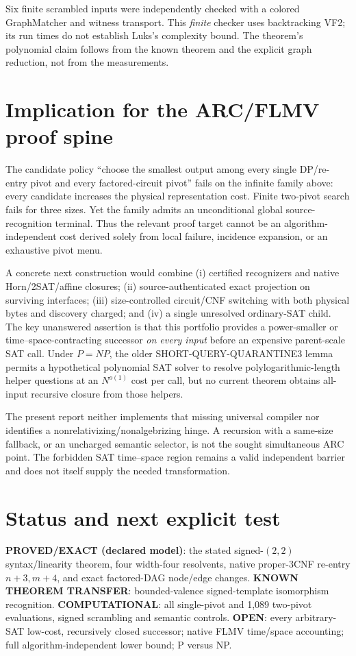 \documentclass[11pt]{article}
\newcommand{\OPEN}{\textbf{OPEN}}
\newcommand{\EXACT}{\textbf{PROVED/EXACT (declared model)}}
\newcommand{\COMP}{\textbf{COMPUTATIONAL}}
\begin{document}
Six finite scrambled inputs were independently checked with a colored
GraphMatcher and witness transport. This \emph{finite} checker uses
backtracking VF2; its run times do not establish Luks's complexity bound.
The theorem's polynomial claim follows from the known theorem and the
explicit graph reduction, not from the measurements.

\section{Implication for the ARC/FLMV proof spine}
The candidate policy ``choose the smallest output among every single
DP/re-entry pivot and every factored-circuit pivot'' fails on the infinite
family above: every candidate increases the physical representation cost.
Finite two-pivot search fails for three sizes. Yet the family admits an
unconditional global source-recognition terminal. Thus the relevant
proof target cannot be an algorithm-independent cost derived solely from
local failure, incidence expansion, or an exhaustive pivot menu.

A concrete next construction would combine (i) certified recognizers and
native Horn/2SAT/affine closures; (ii) source-authenticated exact projection
on surviving interfaces; (iii) size-controlled circuit/CNF switching with
both physical bytes and discovery charged; and (iv) a single unresolved
ordinary-SAT child. The key unanswered assertion is that this portfolio
provides a power-smaller or time--space-contracting successor \emph{on every
input} before an expensive parent-scale SAT call. Under $P=NP$, the older
SHORT-QUERY-QUARANTINE3 lemma permits a hypothetical polynomial SAT solver
to resolve polylogarithmic-length helper questions at an $N^{o(1)}$ cost
per call, but no current theorem obtains all-input recursive closure from
those helpers.

The present report neither implements that missing universal compiler nor
identifies a nonrelativizing/nonalgebrizing hinge. A recursion with a
same-size fallback, or an uncharged semantic selector, is not the
sought simultaneous ARC point. The forbidden SAT time--space region
remains a valid independent barrier\cite{flmv} and does not itself
supply the needed transformation.

\section{Status and next explicit test}
\noindent\EXACT: the stated signed-$(2,2)$ syntax/linearity theorem, four
width-four resolvents, native proper-3CNF re-entry $n+3,m+4$, and exact
factored-DAG node/edge changes. \textbf{KNOWN THEOREM TRANSFER}:
bounded-valence signed-template isomorphism recognition. \COMP:
all single-pivot and 1,089 two-pivot evaluations, signed scrambling and
semantic controls. \OPEN: every arbitrary-SAT low-cost, recursively closed
successor; native FLMV time/space accounting; full algorithm-independent
lower bound; P versus NP.
\end{document}
